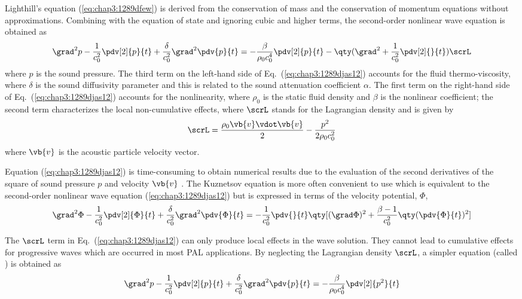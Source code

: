 Lighthill's equation (\ref{eq:chap3:1289dfew}) is derived from the conservation of mass and the conservation of momentum {equations} without approximations.
Combining with the equation of state and ignoring cubic and higher terms,
the second-order nonlinear wave equation is obtained as \cite{Aanonsen1984DistortionHarmonicGeneration}
\begin{equation}
    \grad^2 p - \frac{1}{c_0^2} \pdv[2]{p}{t}
    + 
    \frac{\delta}{c_0^2}\grad^2 \pdv{p}{t}
    =
    - \frac{\beta}{\rho_0c_0^4}
    \pdv[2]{ p}{t}
    - \qty(\grad^2+\frac{1}{c_0^2}\pdv[2]{}{t})\scrL
    \label{eq:chap3:1289djas12}
\end{equation}
where $p$ is the sound pressure.
The third term on the left-hand side of Eq.~(\ref{eq:chap3:1289djas12}) accounts for the fluid thermo-viscosity, where $\delta$ is the sound diffusivity parameter and this is related to the sound attenuation coefficient $\alpha$.
The first term on the right-hand side of Eq.~(\ref{eq:chap3:1289djas12}) accounts for the nonlinearity, where $\rho_0$ is the static fluid density and $\beta$ is the nonlinear coefficient; 
the second term characterizes the local non-cumulative effects, where $\scrL$ stands for the Lagrangian density and is given by 
\begin{equation}
    \scrL = \frac{\rho_0 \vb{v}\vdot \vb{v} }{2} - \frac{p^2}{2\rho_0c_0^2}
    \label{eq:lagrangian_density}
\end{equation}
where $\vb{v}$ is the acoustic particle velocity vector.

Equation (\ref{eq:chap3:1289djas12}) is time-consuming to obtain numerical results due to the evaluation of the second derivatives of the square of sound pressure $p$ and velocity $\vb{v}$ \cite{Kagawa1992FiniteElementSimulation, Cervenka2019VersatileComputationalApproach}.
The Kuznetsov equation is more often convenient to use which is equivalent to the second-order nonlinear wave equation (\ref{eq:chap3:1289djas12}) but is expressed in terms of the velocity potential, $\Phi$, \cite{Aanonsen1984DistortionHarmonicGeneration, Cervenka2019VersatileComputationalApproach}
\begin{equation}
    \grad^2 \Phi - \frac{1}{c_0^2} \pdv[2]{\Phi}{t}
     +\frac{\delta}{c_0^2} \grad^2 \pdv{\Phi}{t}
     =
    -\frac{1}{c_0^2} \pdv{}{t}\qty[(\grad\Phi)^2 + \frac{\beta-1}{c_0^2} \qty(\pdv{\Phi}{t})^2]
    \label{eq:kuznetsov_eq}
\end{equation}

The $\scrL$ term in Eq.~(\ref{eq:chap3:1289djas12}) can only produce local effects in the wave solution.
They cannot lead to cumulative effects for progressive waves which are occurred in most PAL applications.
By neglecting the Lagrangian density $\scrL$, a simpler equation (called ) is obtained as \cite{Aanonsen1984DistortionHarmonicGeneration}
\begin{equation}
    \grad^2 p - \frac{1}{c_0^2} \pdv[2]{p}{t}
    +\frac{\delta}{c_0^2}\grad^2 \pdv{p}{t}
    =
    - \frac{\beta}{\rho_0c_0^4}
    \pdv[2]{ p^2}{t}
    \label{eq:westervelt_eq}
\end{equation}

